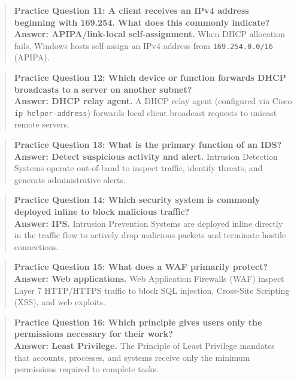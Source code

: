 \begin{quote}
\textbf{Practice Question 11: A client receives an IPv4 address beginning with 169.254. What does this commonly indicate?}\\[4pt]
\vspace{4pt}
\textbf{Answer: APIPA/link-local self-assignment.} When DHCP allocation fails, Windows hosts self-assign an IPv4 address from \texttt{169.254.0.0/16} (APIPA).
\end{quote}
\begin{quote}
\textbf{Practice Question 12: Which device or function forwards DHCP broadcasts to a server on another subnet?}\\[4pt]
\vspace{4pt}
\textbf{Answer: DHCP relay agent.} A DHCP relay agent (configured via Cisco \texttt{ip helper-address}) forwards local client broadcast requests to unicast remote servers.
\end{quote}
\begin{quote}
\textbf{Practice Question 13: What is the primary function of an IDS?}\\[4pt]
\vspace{4pt}
\textbf{Answer: Detect suspicious activity and alert.} Intrusion Detection Systems operate out-of-band to inspect traffic, identify threats, and generate administrative alerts.
\end{quote}
\begin{quote}
\textbf{Practice Question 14: Which security system is commonly deployed inline to block malicious traffic?}\\[4pt]
\vspace{4pt}
\textbf{Answer: IPS.} Intrusion Prevention Systems are deployed inline directly in the traffic flow to actively drop malicious packets and terminate hostile connections.
\end{quote}
\begin{quote}
\textbf{Practice Question 15: What does a WAF primarily protect?}\\[4pt]
\vspace{4pt}
\textbf{Answer: Web applications.} Web Application Firewalls (WAF) inspect Layer 7 HTTP/HTTPS traffic to block SQL injection, Cross-Site Scripting (XSS), and web exploits.
\end{quote}
\begin{quote}
\textbf{Practice Question 16: Which principle gives users only the permissions necessary for their work?}\\[4pt]
\vspace{4pt}
\textbf{Answer: Least Privilege.} The Principle of Least Privilege mandates that accounts, processes, and systems receive only the minimum permissions required to complete tasks.
\end{quote}
